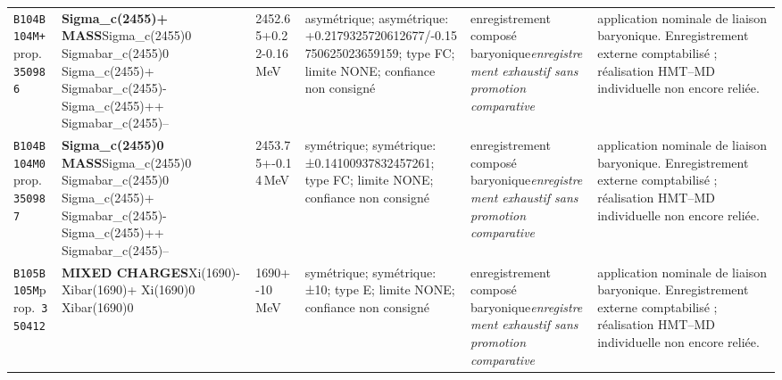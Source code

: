 \begin{landscape}
\begin{longtable}{L{1.85cm}L{4.45cm}L{2.35cm}L{4.05cm}L{3.35cm}L{7.15cm}}
\texttt{B104}\newline \texttt{B104M+}\newline prop.\ \texttt{350986} & \textbf{Sigma\_\allowbreak{}c(2455)+ MASS}\newline Sigma\_\allowbreak{}c(2455)0 \textbar{}\allowbreak{} Sigmabar\_\allowbreak{}c(2455)0 \textbar{}\allowbreak{} Sigma\_\allowbreak{}c(2455)+ \textbar{}\allowbreak{} Sigmabar\_\allowbreak{}c(2455)- \textbar{}\allowbreak{} Sigma\_\allowbreak{}c(2455)++ \textbar{}\allowbreak{} Sigmabar\_\allowbreak{}c(2455)-- & 2452.65+0.22-0.16\,MeV & asymétrique; asymétrique: +0.2179325720612677/-0.15750625023659159; type FC; limite NONE; confiance non consigné & enregistrement composé baryonique\newline \emph{enregistrement exhaustif sans promotion comparative} & application nominale de liaison baryonique. Enregistrement externe comptabilisé ; réalisation HMT--MD individuelle non encore reliée. \\
\texttt{B104}\newline \texttt{B104M0}\newline prop.\ \texttt{350987} & \textbf{Sigma\_\allowbreak{}c(2455)0 MASS}\newline Sigma\_\allowbreak{}c(2455)0 \textbar{}\allowbreak{} Sigmabar\_\allowbreak{}c(2455)0 \textbar{}\allowbreak{} Sigma\_\allowbreak{}c(2455)+ \textbar{}\allowbreak{} Sigmabar\_\allowbreak{}c(2455)- \textbar{}\allowbreak{} Sigma\_\allowbreak{}c(2455)++ \textbar{}\allowbreak{} Sigmabar\_\allowbreak{}c(2455)-- & 2453.75+-0.14\,MeV & symétrique; symétrique: ±0.14100937832457261; type FC; limite NONE; confiance non consigné & enregistrement composé baryonique\newline \emph{enregistrement exhaustif sans promotion comparative} & application nominale de liaison baryonique. Enregistrement externe comptabilisé ; réalisation HMT--MD individuelle non encore reliée. \\
\texttt{B105}\newline \texttt{B105M}\newline prop.\ \texttt{350412} & \textbf{MIXED CHARGES}\newline Xi(1690)- \textbar{}\allowbreak{} Xibar(1690)+ \textbar{}\allowbreak{} Xi(1690)0 \textbar{}\allowbreak{} Xibar(1690)0 & 1690+-10\,MeV & symétrique; symétrique: ±10; type E; limite NONE; confiance non consigné & enregistrement composé baryonique\newline \emph{enregistrement exhaustif sans promotion comparative} & application nominale de liaison baryonique. Enregistrement externe comptabilisé ; réalisation HMT--MD individuelle non encore reliée. \\

\end{longtable}
\end{landscape}
